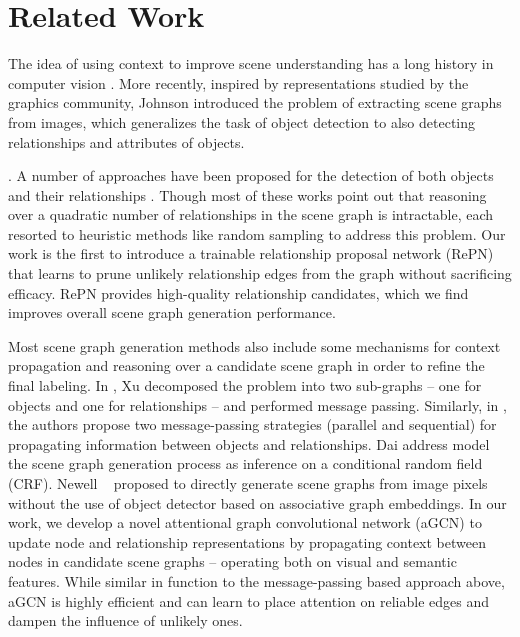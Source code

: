 \section{Related Work}

The idea of using context to improve scene understanding has a long history in computer vision \cite{parikh2008appearance, oliva2007role, ladicky2010graph, rabinovich2007objects}. More recently, inspired by representations studied by the graphics community, Johnson \etal \cite{Johnson2015CVPR} introduced the problem of extracting scene graphs from images, which generalizes the task of object detection \cite{girshick2014rich, girshick2015fast, ren2015faster, redmon2016you, liu2016ssd} to also detecting relationships and attributes of objects.

. A number of approaches have been proposed for the detection of both objects and their relationships \cite{lu2016visual, zhuang2017towards, peyre2017weakly, zhang2017ppr, zhang2017visual, xu2017scene, li2017vip, liang2017deep, dai2017detecting, li2017scene, newell2017pixels, zellers2017neural}. Though most of these works point out that reasoning over a quadratic number of relationships in the scene graph is intractable, each resorted to heuristic methods like random sampling to address this problem. Our work is the first to introduce a trainable relationship proposal network (RePN) that learns to prune unlikely relationship edges from the graph without sacrificing efficacy. RePN provides high-quality relationship candidates, which we find improves overall scene graph generation performance. 

Most scene graph generation methods also include some mechanisms for context propagation and reasoning over a candidate scene graph in order to refine the final labeling. 
In \cite{xu2017scene}, Xu \etal decomposed the problem into two sub-graphs -- one for objects and one for relationships -- and performed message passing. 
Similarly, in \cite{li2017vip}, the authors propose two message-passing strategies (parallel and sequential) for propagating information between objects and relationships. 
Dai \etal \cite{dai2017detecting} address model the scene graph generation process as inference on a conditional random field (CRF). 
Newell \etal ~\cite{newell2017pixels} proposed to directly generate scene graphs  
from image pixels without the use of object detector based on associative graph embeddings. 
%
In our work, we develop a novel attentional graph convolutional network (aGCN) to update node and relationship 
representations by propagating context between nodes in candidate scene graphs -- operating both on visual and semantic features. 
While similar in function to the message-passing based approach above, aGCN is highly efficient and can learn to place 
attention on reliable edges and dampen the influence of unlikely ones. 

